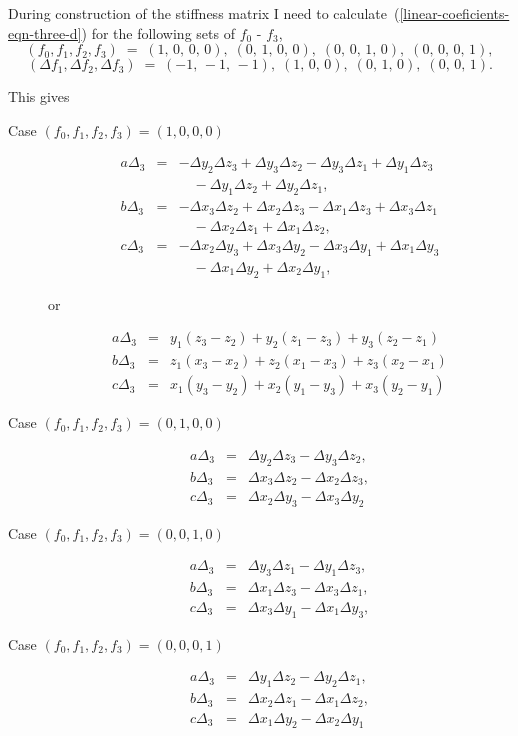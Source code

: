 \documentclass{article}
\def\eqn#1{\begin{displaymath}#1\end{displaymath}}
\def\eqnm#1{\begin{eqnarray*}#1\end{eqnarray*}}
\def\rf#1{(\ref{#1})}
\def\EQS{\; = \;}
\theoremstyle{marginbreak} \theorembodyfont{\itshape}
\begin{document}
During construction of the stiffness matrix I need to
calculate~\rf{linear-coeficients-eqn-three-d} for the following sets
of $f_0$ - $f_3$,
\eqn{
(f_0, f_1, f_2, f_3) \EQS
(1,\,0,\,0,\,0), \; (0,\,1,\,0,\,0), \; (0,\,0,\,1,\,0), \; (0,\,0,\,0,\,1),
}
\eqn{
(\Delta f_1, \Delta f_2, \Delta f_3) \EQS
(-1,\,-1,\,-1), \; (1,\,0,\,0), \; (0,\,1,\,0), \; (0,\,0,\,1).
}

This gives
\begin{description}
\item [Case $(f_0, f_1, f_2, f_3) = (1,0,0,0)$]
\eqnm{
a \Delta_3 &=&
-\Delta y_2 \Delta z_3 + \Delta y_3 \Delta z_2
-\Delta y_3 \Delta z_1 + \Delta y_1 \Delta z_3
\\&& \quad
-\Delta y_1 \Delta z_2 + \Delta y_2 \Delta z_1,
\\
b \Delta_3 &=&
-\Delta x_3 \Delta z_2 + \Delta x_2 \Delta z_3
-\Delta x_1 \Delta z_3 + \Delta x_3 \Delta z_1
\\&& \quad
-\Delta x_2 \Delta z_1 + \Delta x_1 \Delta z_2,
\\
c \Delta_3 &=&
-\Delta x_2 \Delta y_3 + \Delta x_3 \Delta y_2
-\Delta x_3 \Delta y_1 + \Delta x_1 \Delta y_3
\\&& \quad
-\Delta x_1 \Delta y_2 + \Delta x_2 \Delta y_1,
}

or

\eqnm{
a \Delta_3 &=&
y_1 (z_3 - z_2) + y_2 (z_1 - z_3) + y_3 (z_2 - z_1)
\\
b \Delta_3 &=&
z_1 (x_3 - x_2) + z_2 (x_1 - x_3) + z_3 (x_2 - x_1)
\\
c \Delta_3 &=&
x_1 (y_3 - y_2) + x_2 (y_1 - y_3) + x_3 (y_2 - y_1)
}

\item [Case $(f_0, f_1, f_2, f_3) = (0,1,0,0)$]
\eqnm{
a \Delta_3 &=& \Delta y_2 \Delta z_3 - \Delta y_3 \Delta z_2,
\\
b \Delta_3 &=& \Delta x_3 \Delta z_2 - \Delta x_2 \Delta z_3,
\\
c \Delta_3 &=&\Delta x_2 \Delta y_3 - \Delta x_3 \Delta y_2
}

\item [Case $(f_0, f_1, f_2, f_3) = (0,0,1,0)$]
\eqnm{
a \Delta_3 &=&\Delta y_3 \Delta z_1 - \Delta y_1 \Delta z_3,
\\
b \Delta_3 &=& \Delta x_1 \Delta z_3 - \Delta x_3 \Delta z_1,
\\
c \Delta_3 &=& \Delta x_3 \Delta y_1 - \Delta x_1 \Delta y_3,
}

\item [Case $(f_0, f_1, f_2, f_3) = (0,0,0,1)$]
\eqnm{
a \Delta_3 &=& \Delta y_1 \Delta z_2 - \Delta y_2 \Delta z_1,
\\
b \Delta_3 &=& \Delta x_2 \Delta z_1 - \Delta x_1 \Delta z_2,
\\
c \Delta_3 &=& \Delta x_1 \Delta y_2 - \Delta x_2 \Delta y_1
}
\end{description}
\end{document}
